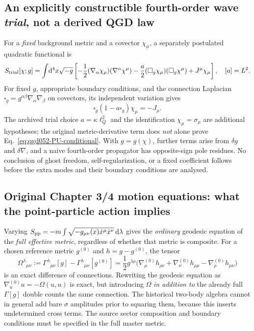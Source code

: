 \documentclass[11pt,a4paper]{article}
\newcommand{\dd}{\mathrm d}
\begin{document}
\subsection{An explicitly constructible fourth-order wave \emph{trial}, not a derived QGD law}
For a \emph{fixed} background metric and a covector $\chi_\mu$, a separately
postulated quadratic functional is
\begin{equation}\label{eq:qgd052-wave-trial-action}
 S_{\rm trial}[\chi;g]=\int\!\dd^4x\sqrt{-g}\left[
 -\frac12(\nabla_\alpha\chi_\mu)(\nabla^\alpha\chi^\mu)
 -\frac{a}{2}(\square_g\chi_\mu)(\square_g\chi^\mu)
 +J^\mu\chi_\mu\right],\quad [a]=L^2.
\end{equation}
For fixed $g$, appropriate boundary conditions, and the connection Laplacian
$\square_g=g^{\alpha\beta}\nabla_\alpha\nabla_\beta$ on covectors, its
independent variation gives
\begin{equation}\label{eq:qgd052-PU-conditional}
 \boxed{\square_g(1-a\square_g)\chi_\mu=-J_\mu.}
\end{equation}
The archived trial choice $a=\kappa\ell_Q^2$ and the identification
$\chi_\mu=\sigma_\mu$ are additional hypotheses; the original metric-derivative
term does \emph{not} alone prove Eq.~\eqref{eq:qgd052-PU-conditional}.
With $g=g(\chi)$, further terms arise from $\delta g$ and $\delta\nabla$,
and a naive fourth-order propagator has opposite-sign pole residues.
No conclusion of ghost freedom, self-regularization, or a fixed coefficient
follows before the extra modes and their boundary conditions are analysed.

\subsection{Original Chapter 3/4 motion equations: what the point-particle action implies}
Varying $S_{\rm pp}=-m\int\sqrt{-g_{\mu\nu}(x)\dot x^\mu\dot x^\nu}\,\dd\lambda$
gives the \emph{ordinary} geodesic equation of the \emph{full effective metric},
regardless of whether that metric is composite.  For a chosen reference metric
$g^{(0)}$ and $h=g-g^{(0)}$, the tensor
\begin{equation}\label{eq:qgd052-Omega-exact}
 \Omega^\lambda{}_{\mu\nu}:=\Gamma^\lambda{}_{\mu\nu}[g]
 -\Gamma^\lambda{}_{\mu\nu}[g^{(0)}]
 =\frac12 g^{\lambda\rho}\bigl(
 \nabla^{(0)}_\mu h_{\rho\nu}+\nabla^{(0)}_\nu h_{\rho\mu}
 -\nabla^{(0)}_\rho h_{\mu\nu}\bigr)
\end{equation}
is an exact difference of connections.  Rewriting the geodesic equation as
$\nabla^{(0)}_u u=-\Omega(u,u)$ is exact, but introducing $\Omega$
\emph{in addition to} the already full $\Gamma[g]$ double counts the same
connection.  The historical two-body algebra cannot in general add bare
$\sigma$ amplitudes prior to squaring them, because this inserts undetermined
cross terms.  The source sector composition and boundary conditions must be
specified in the full master metric.
\end{document}
